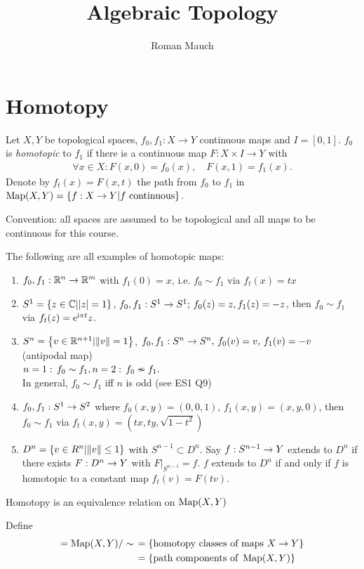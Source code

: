 \documentclass[a4paper,11pt]{article}
\title{\boldmath Algebraic Topology}
\author{Roman Mauch}
\begin{document}
	
	\maketitle
	\flushbottom
	\newpage

	\section{Homotopy}
		
		\begin{defi}
			Let \(X,Y\) be topological spaces, \(f_0,f_1:X\rightarrow Y\) continuous maps 
			and \(I=[0,1]\). \(f_0\) is \textit{homotopic} to \(f_1\) if there is a continuous map 
			\(F:X\times I\rightarrow Y\) with 
			\begin{align}
			\forall x\in X: F(x,0)=f_0(x),\quad F(x,1)=f_1(x).
			\end{align}
			Denote by \(f_t(x)=F(x,t)\) the path from \(f_0\) to \(f_1\) in 
			\(\operatorname{Map}(X,Y)=\{f:X\rightarrow Y|f\text{ continuous}\}\).
		\end{defi}
		Convention: all spaces are assumed to be topological and all maps to be continuous 
		for this course.
		\begin{eg}
			The following are all examples of homotopic maps:
			\begin{enumerate}
				\item \(f_0,f_1:\mathbb{R}^n\rightarrow\mathbb{R}^m\) with \(f_1(0)=x\), i.e. \(f_0\sim f_1\) via 
				\(f_t(x)=t x\)
				\item \(S^1=\left\{ z\in\mathbb{C}||z|=1\right\},\,f_0,f_1:S^1\rightarrow S^1;\,f_0(z)=z,f_1(z)=-z\), then \(f_0\sim f_1\) via \(f_t(z)=\mathrm{e}^{\mathrm{i}\pi t}z\).
				\item \(S^n=\left\{ v\in\mathbb{R}^{n+1}|\norm{v}=1 \right\}\), \(f_0,f_1:S^n\rightarrow S^n,\,f_0(v)=v,\,f_1(v)=-v\) (antipodal map)\\
				\(n=1:\,f_0\sim f_1,\\ n=2:\,f_0\nsim f_1.\)\\ In general, \(f_0\sim f_1\) iff $n$ is odd (see ES1 Q9)
				\item \(f_0,f_1: S^1\rightarrow S^2\) where \(f_0(x,y)=(0,0,1),\,f_1(x,y)=(x,y,0)\), then \(f_0\sim f_1\) via \(f_t(x,y)=(tx,ty,\sqrt{1-t^2})\)
				\item \(D^n=\left\{ v\in R^n|\norm{v}\le1\right\}\) with \(S^{n-1}\subset D^n\). Say \(f:S^{n-1}\rightarrow Y\) extends to \(D^n\) if there exists \(F:D^n\rightarrow Y\) with \(F|_{S^{n-1}}=f\). $f$ extends to $D^n$ if and only if $f$ is homotopic to a constant map $f_t(v)=F(tv)$.
			\end{enumerate}
		\end{eg}
		\begin{lemma}
		Homotopy is an equivalence relation on $\operatorname{Map}(X,Y)$ 
		\end{lemma}
		\begin{defi}
		Define 
		\begin{align*}
			[X,Y]=\map(X,Y)/\sim\,&=\left\{ \text{homotopy classes of maps }X\ra Y\right\}\\&=\left\{ \text{path components of }\map(X,Y)\right\}
		\end{align*}
		\end{defi}
		
\end{document}
